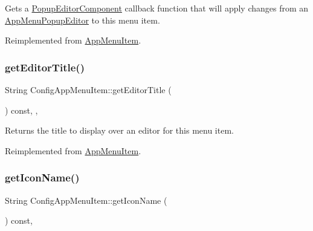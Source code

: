 Gets a \mbox{\hyperlink{classPopupEditorComponent}{Popup\+Editor\+Component}} callback function that will apply changes from an \mbox{\hyperlink{classAppMenuPopupEditor}{App\+Menu\+Popup\+Editor}} to this menu item. 

Reimplemented from \mbox{\hyperlink{classAppMenuItem_af742017ff127e5f36da1e206205c86ee}{App\+Menu\+Item}}.

\mbox{\label{classConfigAppMenuItem_a4982d39204f8e5449917a934866fd0f3}} 
\subsubsection{\texorpdfstring{get\+Editor\+Title()}{getEditorTitle()}}
{\footnotesize\ttfamily String Config\+App\+Menu\+Item\+::get\+Editor\+Title (\begin{DoxyParamCaption}{ }\end{DoxyParamCaption}) const\hspace{0.3cm}{\ttfamily [override]}, {\ttfamily [protected]}, {\ttfamily [virtual]}}

\begin{DoxyReturn}{Returns}
the title to display over an editor for this menu item. 
\end{DoxyReturn}


Reimplemented from \mbox{\hyperlink{classAppMenuItem_a4f0501780311afb7630d99b9e84a5c9d}{App\+Menu\+Item}}.

\mbox{\label{classConfigAppMenuItem_a63f0a259553e03a6f33336777c753f74}} 
\subsubsection{\texorpdfstring{get\+Icon\+Name()}{getIconName()}}
{\footnotesize\ttfamily String Config\+App\+Menu\+Item\+::get\+Icon\+Name (\begin{DoxyParamCaption}{ }\end{DoxyParamCaption}) const\hspace{0.3cm}{\ttfamily [override]}, {\ttfamily [virtual]}}

